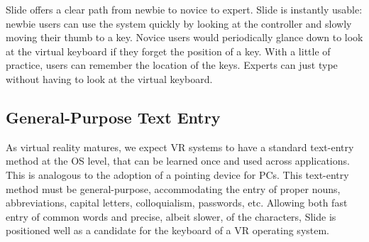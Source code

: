 Slide offers a clear path from newbie to novice to expert. 
Slide is instantly usable: newbie users can use the system quickly by looking at the controller and slowly moving their thumb to a key.
Novice users would periodically glance down to look at the virtual keyboard if they forget the position of a key. 
With a little of practice, users can remember the location of the keys.  
Experts can just type without having to look at the virtual keyboard. 

\subsection{General-Purpose Text Entry}
As virtual reality matures, we expect VR systems to have a standard text-entry method at the OS level, that can be learned once and used across applications. 
This is analogous to the adoption of a pointing device for PCs.  This text-entry method must be general-purpose, accommodating the entry of 
proper nouns, abbreviations, capital letters, colloquialism, passwords, etc. 
Allowing both fast entry of common words and precise, albeit slower, of the characters, Slide is positioned well as a candidate for the keyboard of a VR operating system.        

\begin{comment}
\subsection{Accessibility}
Virtual reality gives access access to something that they might never see in real life.
But for a disabled person, virtual reality might be the path to inclusion.
SwipeVR can be adapted for assistive technology products such as wands, joysticks, trackballs, touch screens.


\subsection{End}

concluding notes
\\
We present a fast text entry input device for virtual reality.
It is faster than the state of the art.
It can be used in public.
It dosnt tire your arms or vocal chords.

Using virtual reality for programming is a rich area for further discovery.
The large workspace that virtual reality provides is received well by users.

They keyboard is currently the weak point in many virtual reality applications.

Touch-typing on the keyboard is difficult as is switching context between the virtual reality controllers and the keyboard.

In the future, high-quality virtual reality headsets will be standalone devices, not tethered to desktop computers \cite{schaller1997moore}.
As the price of headsets decrease \cite{brown2016virtual}, virtual reality is positioned to become a democratizing technology.
Thus it is a worthwhile endeavour to determine how to program in virtual reality, both as a teaching tool for novices and as a more expressive tool for experts.

\end{comment}
